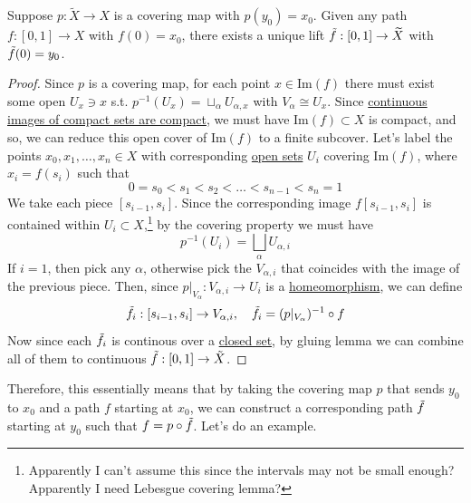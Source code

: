   \begin{lemma}
    \label{thm:path-lifting-property}
    Suppose $p: \widetilde{X} \to X$ is a covering map with $p(y_0) = x_0$. Given any path $f: [0, 1] \to X$ with $f(0) = x_0$, there exists a unique lift $\Tilde{f}: [0, 1] \to \widetilde{X}$ with $\Tilde{f}(0) = y_0$.
  \end{lemma}
	\begin{proof}
		Since $p$ is a covering map, for each point $x \in \mathrm{Im}(f)$ there must exist some open $U_x \ni x$ s.t. $p^{-1}(U_x) = \sqcup_{\alpha} U_{\alpha, x}$ with $V_\alpha \cong U_x$. Since \hyperref[pst-thm:continuous-images-of-compact-sets-are-compact]{continuous images of compact sets are compact}, we must have $\mathrm{Im}(f) \subset X$ is compact, and so, we can reduce this open cover of $\mathrm{Im}(f)$ to a finite subcover. Let's label the points $x_0, x_1, \ldots, x_n \in X$ with corresponding \hyperref[pst-def:open-set]{open sets} $U_i$ covering $\mathrm{Im}(f)$, where $x_i = f(s_i)$ such that  
		\begin{equation}
			0 = s_0 < s_1 < s_2 < \ldots < s_{n-1} < s_n = 1
		\end{equation}
		We take each piece $[s_{i-1}, s_i]$. Since the corresponding image $f[s_{i-1}, s_i]$ is contained within $U_i \subset X$,\footnote{Apparently I can't assume this since the intervals may not be small enough? Apparently I need Lebesgue covering lemma?} by the covering property we must have 
		\begin{equation}
			p^{-1} (U_i) = \bigsqcup_{\alpha} U_{\alpha, i}
		\end{equation}
		If $i = 1$, then pick any $\alpha$, otherwise pick the $V_{\alpha, i}$ that coincides with the image of the previous piece. Then, since $p|_{V_\alpha}: V_{\alpha, i}  \to U_i$ is a \hyperref[pst-def:homeomorphism]{homeomorphism}, we can define 
		\begin{equation}
			\Tilde{f}_i: [s_{i-1}, s_i] \to V_{\alpha, i}, \quad \Tilde{f}_i = (p|_{V_\alpha})^{-1} \circ f
		\end{equation}
		Now since each $\Tilde{f}_i$ is continous over a \hyperref[pst-def:closed]{closed set}, by gluing lemma we can combine all of them to continuous $\Tilde{f}: [0, 1] \to \Tilde{X}$. 
	\end{proof}

  Therefore, this essentially means that by taking the covering map $p$ that sends $y_0$ to $x_0$ and a path $f$ starting at $x_0$, we can construct a corresponding path $\Tilde{f}$ starting at $y_0$ such that $f = p \circ \Tilde{f}$. Let's do an example. 

